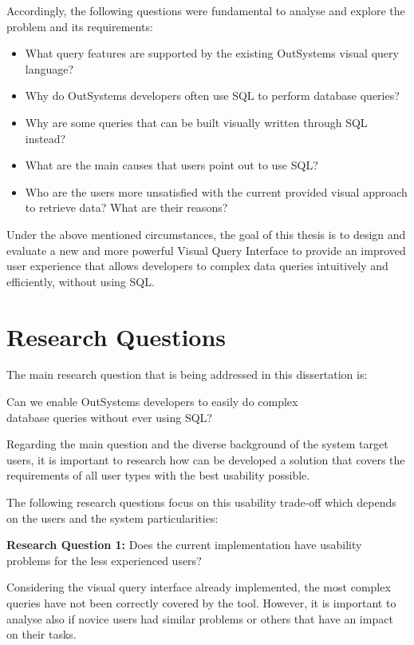 Accordingly, the following questions were fundamental to analyse and explore the problem and its requirements:
\begin{itemize}
  \item What query features are supported by the existing OutSystems visual query language?
  \item Why do OutSystems developers often use SQL to perform database queries?
  \item Why are some queries that can be built visually written through SQL instead?
  \item What are the main causes that users point out to use SQL?
  \item Who are the users more unsatisfied with the current provided visual approach to retrieve data? What are their reasons?
\end{itemize}

Under the above mentioned circumstances, the goal of this thesis is to design and evaluate a new and more powerful Visual Query Interface to provide an improved user experience that allows developers to complex data queries intuitively and efficiently, without using SQL.

\section{Research Questions}
\label{sec:research_questions}
The main research question that is being addressed in this dissertation is:
\begin{center}
  Can we enable OutSystems developers to easily do complex \\ database queries without ever using SQL?
\end{center}

Regarding the main question and the diverse background of the system target users, it is important to research how can be developed a solution that covers the requirements of all user types with the best usability possible.

The following research questions focus on this usability trade-off which depends on the users and the system particularities:

\medskip

\textbf{Research Question 1:} Does the current implementation have usability problems for the less experienced users?

\medskip

Considering the visual query interface already implemented, the most complex queries have not been correctly covered by the tool. However, it is important to analyse also if novice users had similar problems or others that have an impact on their tasks.

